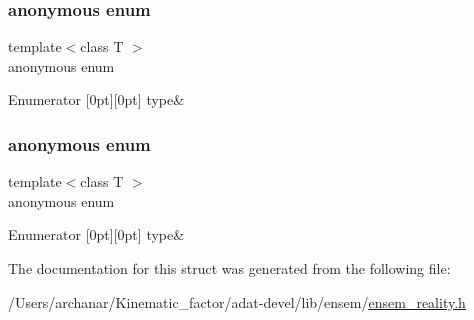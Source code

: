 \subsubsection{\texorpdfstring{anonymous enum}{anonymous enum}}
{\footnotesize\ttfamily template$<$class T $>$ \\
anonymous enum}

\begin{DoxyEnumFields}{Enumerator}
[0pt][0pt]{}\mbox{\label{structENSEM_1_1EnsbcIO_3_01RScalar_3_01T_01_4_01_4_a5880ee6fb3303abec2df1a781f154621a2700b782b422b58c4855d989a57b71c1}} 
type&\\
\hline

\end{DoxyEnumFields}
\mbox{\label{structENSEM_1_1EnsbcIO_3_01RScalar_3_01T_01_4_01_4_a5880ee6fb3303abec2df1a781f154621}} 
\subsubsection{\texorpdfstring{anonymous enum}{anonymous enum}}
{\footnotesize\ttfamily template$<$class T $>$ \\
anonymous enum}

\begin{DoxyEnumFields}{Enumerator}
[0pt][0pt]{}\mbox{\label{structENSEM_1_1EnsbcIO_3_01RScalar_3_01T_01_4_01_4_a5880ee6fb3303abec2df1a781f154621a2700b782b422b58c4855d989a57b71c1}} 
type&\\
\hline

\end{DoxyEnumFields}


The documentation for this struct was generated from the following file\+:\begin{DoxyCompactItemize}
\item 
/\+Users/archanar/\+Kinematic\+\_\+factor/adat-\/devel/lib/ensem/\mbox{\hyperlink{adat-devel_2lib_2ensem_2ensem__reality_8h}{ensem\+\_\+reality.\+h}}\end{DoxyCompactItemize}
